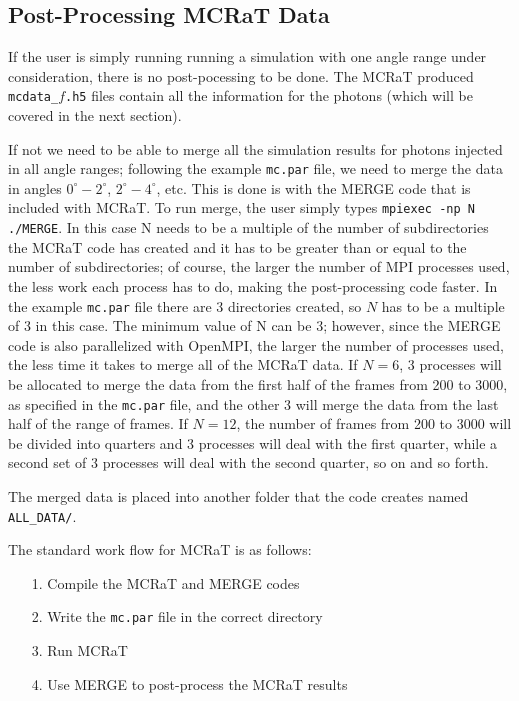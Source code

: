 \documentclass[12pt,a4paper]{article}
\begin{document}
 \subsection{Post-Processing MCRaT Data}
 If the user is simply running running a simulation with one angle range under consideration, there is no post-pocessing to be done. The MCRaT produced \texttt{mcdata\_$f$.h5} files contain all the information for the photons (which will be covered in the next section).
 
 If not we need to be able to merge all the simulation results for photons injected in all angle ranges; following the example \texttt{mc.par} file, we need to merge the data in angles $0^\circ-2^\circ$, $2^\circ-4^\circ$, etc. This is done is with the MERGE code that is included with MCRaT. To run merge, the user simply types \texttt{mpiexec -np N ./MERGE}. In this case N needs to be a multiple of the number of subdirectories the MCRaT code has created and it has to be greater than or equal to the number of subdirectories; of course, the larger the number of MPI processes used, the less work each process has to do, making the post-processing code faster. In the example \texttt{mc.par} file there are 3 directories created, so $N$ has to be a multiple of 3 in this case. The minimum value of N can be $3$; however, since the MERGE code is also parallelized with OpenMPI, the larger the number of processes used, the less time it takes to merge all of the MCRaT data.  If $N=6$, 3 processes will be allocated to merge the data from the first half of the frames from 200 to 3000, as specified in the \texttt{mc.par} file, and the other 3 will merge the data from the last half of the range of frames. If $N=12$, the number of frames from 200 to 3000 will be divided into quarters and 3 processes will deal with the first quarter, while a second set of 3 processes will deal with the second quarter, so on and so forth. 
 
 The merged data is placed into another folder that the code creates named \texttt{ALL\_DATA/}. \newline
 
 \noindent The standard work flow for MCRaT is as follows:
 \begin{itemize}
 \item[1.] Compile the MCRaT and MERGE codes
 \item[2.] Write the \texttt{mc.par} file in the correct directory
 \item[3.] Run MCRaT
 \item[4.] Use MERGE to post-process the MCRaT results
 \end{itemize}
 
\end{document}
